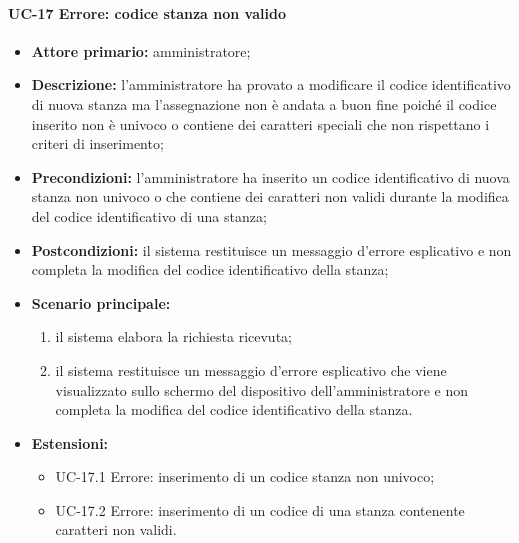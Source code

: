 \paragraph{UC-17 Errore: codice stanza non valido}
\begin{itemize}
	\item \textbf{Attore primario:} amministratore;
	\item \textbf{Descrizione:} l'amministratore ha provato a modificare il codice identificativo di nuova stanza ma l'assegnazione non è andata a buon fine poiché il codice inserito non è univoco o contiene dei caratteri speciali che non rispettano i criteri di inserimento;
	\item \textbf{Precondizioni:} l'amministratore ha inserito un codice identificativo di nuova stanza non univoco o che contiene dei caratteri non validi durante la modifica del codice identificativo di una stanza;
	\item \textbf{Postcondizioni:} il sistema restituisce un messaggio d'errore esplicativo e non completa la modifica del codice identificativo della stanza;
	\item \textbf{Scenario principale:}
	      \begin{enumerate}
		      \item il sistema elabora la richiesta ricevuta;
		      \item il sistema restituisce un messaggio d'errore esplicativo che viene visualizzato sullo schermo del dispositivo dell'amministratore e non completa la modifica del codice identificativo della stanza.
	      \end{enumerate}
	 \item \textbf{Estensioni:}
	 	\begin{itemize}
		       \item UC-17.1 Errore: inserimento di un codice stanza non univoco;
		       \item UC-17.2 Errore: inserimento di un codice di una stanza contenente caratteri non validi.
	        \end{itemize}
\end{itemize}

